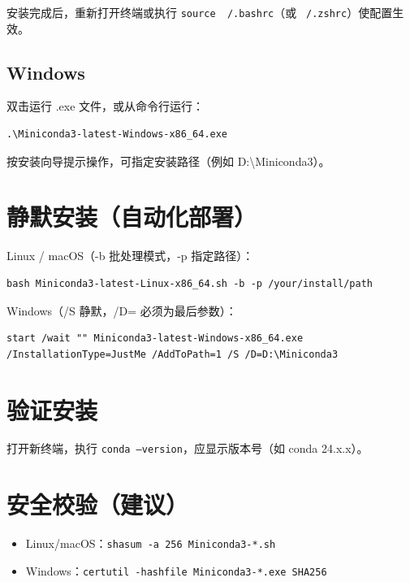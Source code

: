 \documentclass[12pt,UTF8]{ctexbook}
\begin{document}
安装完成后，重新打开终端或执行 \texttt{source ~/.bashrc}（或 \texttt{~/.zshrc}）使配置生效。

\subsection{Windows}

双击运行 .exe 文件，或从命令行运行：

\begin{lstlisting}
.\Miniconda3-latest-Windows-x86_64.exe
\end{lstlisting}

按安装向导提示操作，可指定安装路径（例如 D:\textbackslash Miniconda3）。

\section{静默安装（自动化部署）}
\label{sec:silent_install}

Linux / macOS（-b 批处理模式，-p 指定路径）：

\begin{lstlisting}
bash Miniconda3-latest-Linux-x86_64.sh -b -p /your/install/path
\end{lstlisting}

Windows（/S 静默，/D= 必须为最后参数）：

\begin{lstlisting}
start /wait "" Miniconda3-latest-Windows-x86_64.exe /InstallationType=JustMe /AddToPath=1 /S /D=D:\Miniconda3
\end{lstlisting}

\section{验证安装}
\label{sec:verify_install}

打开新终端，执行 \texttt{conda --version}，应显示版本号（如 conda 24.x.x）。

\section{安全校验（建议）}
\label{sec:security_check}

\begin{itemize}[leftmargin=2cm]
    \item Linux/macOS：\texttt{shasum -a 256 Miniconda3-*.sh}
    \item Windows：\texttt{certutil -hashfile Miniconda3-*.exe SHA256}
\end{itemize}
\end{document}
